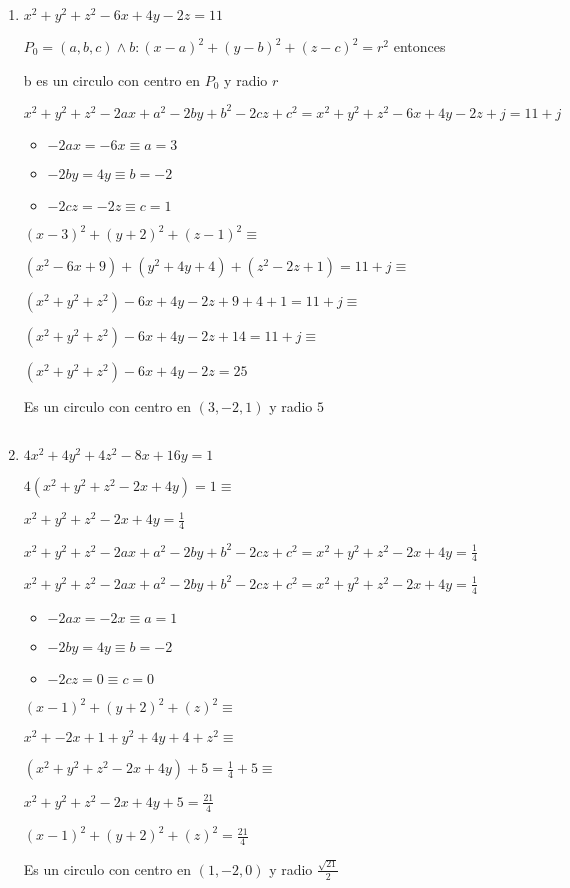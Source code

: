 \documentclass[../practica_01.tex]{subfiles}
\begin{document}
    \begin{enumerate}
        \item $x^2+y^2+z^2-6x+4y-2z = 11$

        $P_0 = (a,b,c) \wedge b: (x-a)^2+(y-b)^2+(z-c)^2 = r^2$ entonces

        b es un circulo con centro en $P_0$ y radio $r$

        $x^2 + y^2 + z^2 - 2ax + a^2 - 2by + b^2 - 2cz + c^2 = x^2 + y^2 + z^2 - 6x + 4y - 2z + j = 11 + j$

        \begin{itemize}
            \item $-2ax = -6x \equiv a = 3$
            \item $-2by = 4y \equiv b = -2$
            \item $-2cz = -2z \equiv c = 1$
        \end{itemize}

        $(x-3)^2+(y+2)^2+(z-1)^2 \equiv$
        
        $(x^2 - 6x + 9) + (y^2 + 4y + 4) + (z^2 - 2z + 1) = 11 + j \equiv$
        
        $(x^2 + y^2 + z^2) - 6x + 4y - 2z + 9 + 4 + 1 = 11 + j \equiv$

        $(x^2 + y^2 + z^2) - 6x + 4y - 2z + 14 = 11 + j \equiv $

        $(x^2 + y^2 + z^2) - 6x + 4y - 2z = 25$
        
        Es un circulo con centro en $(3,-2,1)$ y radio $5$

        $ $

        \item $4x^2 + 4y^2 + 4z^2 - 8x + 16y = 1$
        
        $4(x^2 + y^2 + z^2 - 2x + 4y) = 1 \equiv$

        $x^2 + y^2 + z^2 - 2x + 4y = \frac{1}{4}$

        $x^2 + y^2 + z^2 - 2ax + a^2 - 2by + b^2 - 2cz + c^2 = x^2 + y^2 + z^2 - 2x + 4y = \frac{1}{4}$

        $x^2 + y^2 + z^2 - 2ax + a^2 - 2by + b^2 - 2cz + c^2 = x^2 + y^2 + z^2 - 2x + 4y = \frac{1}{4}$

        \begin{itemize}
            \item $-2ax = -2x \equiv a = 1$
            \item $-2by = 4y \equiv b = -2$
            \item $-2cz = 0 \equiv c = 0$
        \end{itemize}

        $(x-1)^2+(y+2)^2+(z)^2 \equiv$

        $x^2 + -2x + 1 + y^2 + 4y + 4 + z^2 \equiv$

        $(x^2 + y^2 + z^2 - 2x + 4y) + 5 = \frac{1}{4} + 5 \equiv$

        $x^2 + y^2 + z^2 - 2x + 4y + 5 = \frac{21}{4} $

        $(x-1)^2+(y+2)^2+(z)^2 = \frac{21}{4} $

        Es un circulo con centro en $(1,-2,0)$ y radio $\frac{\sqrt{21}}{2}$

    \end{enumerate}
\end{document}
